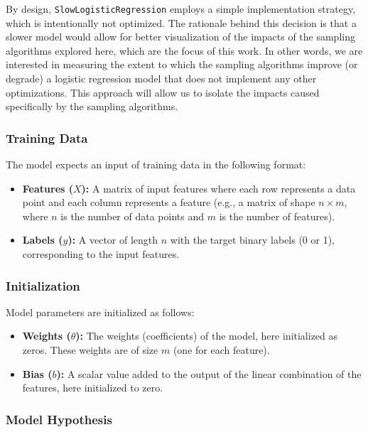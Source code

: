 \documentclass{article}
\theoremstyle{plain}
\theoremstyle{definition}
\theoremstyle{remark}
\begin{document}
By design, \texttt{SlowLogisticRegression} employs a simple implementation strategy, which is intentionally not optimized. The rationale behind this decision is that a slower model would allow for better visualization of the impacts of the sampling algorithms explored here, which are the focus of this work. In other words, we are interested in measuring the extent to which the sampling algorithms improve (or degrade) a logistic regression model that does not implement any other optimizations. This approach will allow us to isolate the impacts caused specifically by the sampling algorithms.


\subsubsection{Training Data}

The model expects an input of training data in the following format:
\begin{itemize}

\item \textbf{Features ($X$):} A matrix of input features where each row represents a data point and each column represents a feature (e.g., a matrix of shape $n \times m$, where $n$ is the number of data points and $m$ is the number of features).

\item \textbf{Labels ($y$):} A vector of length $n$ with the target binary labels (0 or 1), corresponding to the input features.
\end{itemize}


\subsubsection{Initialization}

Model parameters are initialized as follows:

\begin{itemize}
\item \textbf{Weights ($\theta$):} The weights (coefficients) of the model, here initialized as zeros. These weights are of size $m$ (one for each feature).

\item \textbf{Bias ($b$):} A scalar value added to the output of the linear combination of the features, here initialized to zero.

\end{itemize}


\subsubsection{Model Hypothesis}
\end{document}
